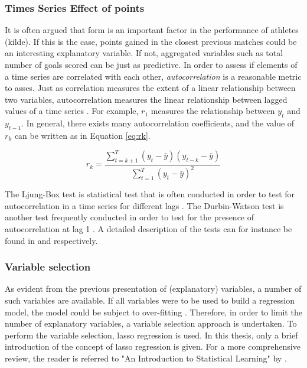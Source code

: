 \subsubsection{Times Series Effect of points}

It is often argued that form is an important factor in the performance of athletes (kilde). If this is the case, points gained in the closest previous matches could be an interesting explanatory variable. If not, aggregated variables such as total number of goals scored can be just as predictive. In order to assess if elements of a time series are correlated with each other, \textit{autocorrelation} is a reasonable metric to asses. Just as correlation measures the extent of a linear relationship between two variables, autocorrelation measures the linear relationship between lagged values of a time series \citep{Hyndman}. For example, $r_1$ measures the relationship between $y_t$ and $y_{t-1}$. In general, there exists many autocorrelation coefficients, and the value of $r_k$ can be written as in Equation \ref{eq:rk}. 


\begin{equation}\label{eq:rk}
    r_k = \frac{\sum_{t=k+1}^T(y_t-\bar{y})(y_{t-k}-\bar{y})}{\sum_{t=1}^T(y_t-\bar{y})^2}
\end{equation}

The Ljung-Box test is statistical test that is often conducted in order to test for autocorrelation in a time series for different lags \citep{Hyndman}. The Durbin-Watson test is another test frequently conducted in order to test for the presence of autocorrelation at lag 1 \citep{Carol_1}. A detailed description of the tests can for instance be found in \cite{Hyndman} and \cite{Carol_1} respectively.

\subsubsection{Variable selection}

As evident from the previous presentation of (explanatory) variables, a number of such variables are available. If all variables were to be used to build a regression model, the model could be subject to over-fitting \citep{ISLR}. Therefore, in order to limit the number of explanatory variables, a variable selection approach is undertaken. To perform the variable selection, lasso regression is used. In this thesis, only a brief introduction of the concept of lasso regression is given. For a more comprehensive review, the reader is referred to "An Introduction to Statistical Learning" by \cite{ISLR}.\newpar

